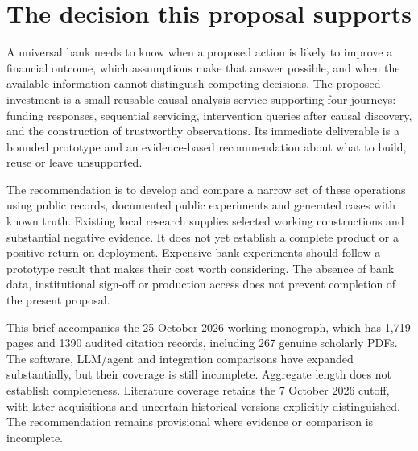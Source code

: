 \hypertarget{the-decision-this-proposal-supports}{%
\section{The decision this proposal
supports}\label{the-decision-this-proposal-supports}}

A universal bank needs to know when a proposed action is likely to
improve a financial outcome, which assumptions make that answer
possible, and when the available information cannot distinguish
competing decisions. The proposed investment is a small reusable
causal-analysis service supporting four journeys: funding responses,
sequential servicing, intervention queries after causal discovery, and
the construction of trustworthy observations. Its immediate deliverable
is a bounded prototype and an evidence-based recommendation about what
to build, reuse or leave unsupported.

The recommendation is to develop and compare a narrow set of these
operations using public records, documented public experiments and
generated cases with known truth. Existing local research supplies
selected working constructions and substantial negative evidence. It
does not yet establish a complete product or a positive return on
deployment. Expensive bank experiments should follow a prototype result
that makes their cost worth considering. The absence of bank data,
institutional sign-off or production access does not prevent completion
of the present proposal. \citep{sp13_scope}

This brief accompanies the 25 October 2026 working monograph, which has
1,719 pages and 1390 audited citation records, including 267 genuine
scholarly PDFs. The software, LLM/agent and integration comparisons have
expanded substantially, but their coverage is still incomplete.
Aggregate length does not establish completeness. Literature coverage
retains the 7 October 2026 cutoff, with later acquisitions and uncertain
historical versions explicitly distinguished. The recommendation remains
provisional where evidence or comparison is incomplete.
\citep{sp23nt_reader,sp23lt_reader,sp23dw_reader,sp23sm_reader,sp22wf_reader,sp22ft_reader,sp22si_reader,sp22ob_reader,sp22dk_reader,sp22iv_reader,sp22bs_reader,sp21rr_reader,sp21pr_reader,sp21gs_reader,sp21eo_reader,sp21tr_reader,sp21ae_reader,sp21gr_reader,sp21ck_reader,sp21cx_reader,sp20md_reader,sp20gf_reader,sp20hy_reader,sp20je_reader,sp20nc_reader,sp20gc_reader,sp20ea_reader,sp20vm_reader,sp20pye_reader,sp20fx_reader,sp20pa_reader,sp20rfx_reader}

